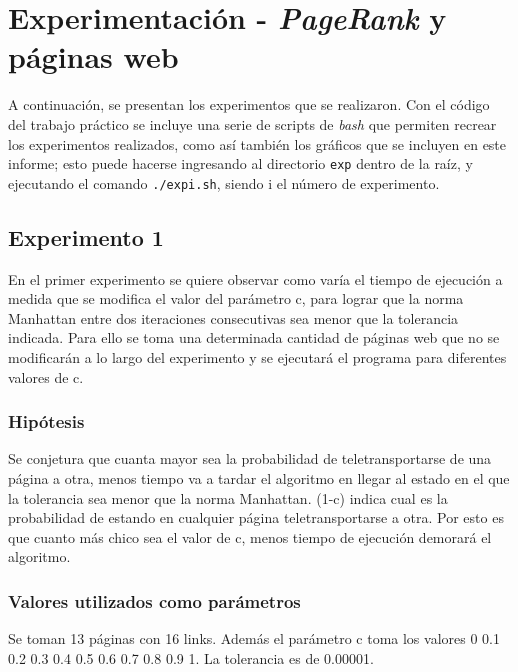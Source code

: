\section{Experimentación - \emph{PageRank} y páginas web}
	A continuación, se presentan los experimentos que se realizaron. Con el código del trabajo práctico se incluye una serie de scripts de \emph{bash} que permiten recrear los experimentos realizados, como así también los gráficos que se incluyen en este informe; esto puede hacerse ingresando al directorio \texttt{exp} dentro de la raíz, y ejecutando el comando \texttt{./expi.sh}, siendo i el número de experimento.

	\subsection{Experimento 1}
	En el primer experimento se quiere observar como varía el tiempo de ejecución a medida que se modifica el valor del parámetro c, para lograr que la norma Manhattan entre dos iteraciones consecutivas sea menor que la tolerancia indicada. Para ello se toma una determinada cantidad de páginas web que no se modificarán a lo largo del experimento y se ejecutará el programa para diferentes valores de c. 

		\subsubsection*{Hipótesis} 
		Se conjetura que cuanta mayor sea la probabilidad de teletransportarse de una página a otra, menos tiempo va a tardar el algoritmo en llegar al estado en el que la tolerancia sea menor que la norma Manhattan. (1-c) indica cual es la probabilidad de estando en cualquier página teletransportarse a otra. Por esto es que cuanto más chico sea el valor de c, menos tiempo de ejecución demorará el algoritmo.

		\subsubsection*{Valores utilizados como parámetros} 
		Se toman 13 páginas con 16 links. Además el parámetro c toma los valores 0 0.1 0.2 0.3 0.4 0.5 0.6 0.7 0.8 0.9 1. La tolerancia es de 0.00001.

